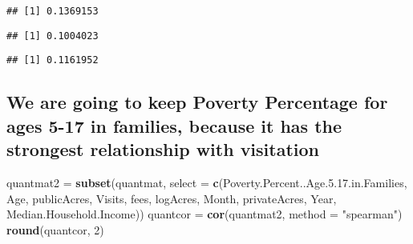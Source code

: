 \documentclass[
]{article}
\newenvironment{Shaded}{\begin{snugshade}}{\end{snugshade}}
\newcommand{\DataTypeTok}[1]{\textcolor[rgb]{0.13,0.29,0.53}{#1}}
\newcommand{\DecValTok}[1]{\textcolor[rgb]{0.00,0.00,0.81}{#1}}
\newcommand{\FloatTok}[1]{\textcolor[rgb]{0.00,0.00,0.81}{#1}}
\newcommand{\KeywordTok}[1]{\textcolor[rgb]{0.13,0.29,0.53}{\textbf{#1}}}
\newcommand{\NormalTok}[1]{#1}
\newcommand{\OperatorTok}[1]{\textcolor[rgb]{0.81,0.36,0.00}{\textbf{#1}}}
\newcommand{\StringTok}[1]{\textcolor[rgb]{0.31,0.60,0.02}{#1}}
\begin{document}
\begin{Shaded}
\end{Shaded}

\begin{verbatim}
## [1] 0.1369153
\end{verbatim}

\begin{Shaded}
\end{Shaded}

\begin{verbatim}
## [1] 0.1004023
\end{verbatim}

\begin{Shaded}
\end{Shaded}

\begin{verbatim}
## [1] 0.1161952
\end{verbatim}

\hypertarget{we-are-going-to-keep-poverty-percentage-for-ages-5-17-in-families-because-it-has-the-strongest-relationship-with-visitation}{%
\subsection{We are going to keep Poverty Percentage for ages 5-17 in
families, because it has the strongest relationship with
visitation}\label{we-are-going-to-keep-poverty-percentage-for-ages-5-17-in-families-because-it-has-the-strongest-relationship-with-visitation}}

\begin{Shaded}
\begin{Highlighting}[]
\NormalTok{quantmat2 =}\StringTok{ }\KeywordTok{subset}\NormalTok{(quantmat, }\DataTypeTok{select =} \KeywordTok{c}\NormalTok{(Poverty.Percent..Age.}\DecValTok{5}\NormalTok{.}\FloatTok{17.}\NormalTok{in.Families, Age, publicAcres, Visits, fees, logAcres, Month, privateAcres, Year, Median.Household.Income))}
\NormalTok{quantcor =}\StringTok{ }\KeywordTok{cor}\NormalTok{(quantmat2, }\DataTypeTok{method =} \StringTok{"spearman"}\NormalTok{)}
\KeywordTok{round}\NormalTok{(quantcor, }\DecValTok{2}\NormalTok{)}
\end{Highlighting}
\end{Shaded}
\end{document}
